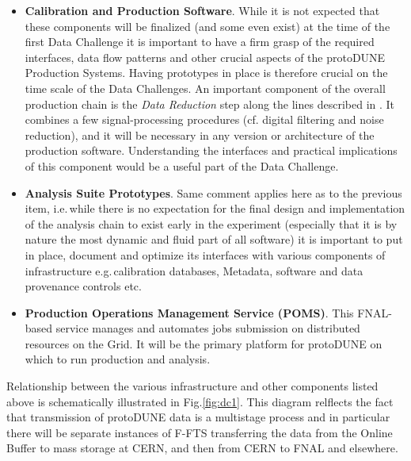 \documentclass[pdftex,12pt,letter]{article}
\newcommand{\pd}{protoDUNE\xspace}
\begin{document}
\begin{itemize}
\item \textbf{Calibration and Production Software}. While it is not expected that these components will be finalized
(and some even exist) at the time of the first Data Challenge it is important to have a firm grasp of the required interfaces,
data flow patterns and other crucial aspects of the \pd Production Systems. Having prototypes in place is therefore crucial
on the time scale of the Data Challenges.
An important component of the overall production chain is the \textit{Data Reduction} step along the lines described
in \cite{docdb2089}. It combines a few signal-processing procedures (cf. digital filtering and noise reduction), and it will be
necessary in any version or architecture of the production software.
Understanding the interfaces and practical implications of this component would be a useful part of the Data Challenge.

\item \textbf{Analysis Suite Prototypes}. Same comment applies here as to the previous item, i.e.\,while there is no expectation
for the final design and implementation of the analysis chain to exist early in the experiment (especially that it is by nature the most
dynamic and fluid part of all software) it is important to put in place, document and optimize its interfaces with various components
of infrastructure e.g.\,calibration databases, Metadata, software and data provenance controls etc.

\item \textbf{Production Operations Management Service (POMS)}. This FNAL-based service \cite{poms} manages and automates jobs
submission on distributed resources on the Grid. It will be the primary platform for \pd on which to run production and analysis.


\end{itemize}
\noindent Relationship between the various infrastructure and other components listed above is schematically illustrated in
Fig.\ref{fig:dc1}. This diagram relflects the fact that transmission of \pd data is a multistage process and in particular there
will be separate instances of F-FTS transferring the data from the Online Buffer to mass storage at CERN, and then from
CERN to FNAL and elsewhere.

\end{document}
